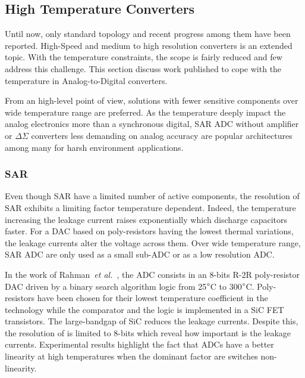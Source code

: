 \clearpage
\subsection{High Temperature Converters}     %
\label{sec:high-temp-adc}
Until now, only standard topology and recent progress among them have been reported. High-Speed and medium to high resolution converters is an extended topic. With the temperature constraints, the scope is fairly reduced and few address this challenge. This section discuss work published to cope with the temperature in Analog-to-Digital converters.

From an high-level point of view, solutions with fewer sensitive components over wide temperature range are preferred. As the temperature deeply impact the analog electronics more than a synchronous digital, SAR ADC without amplifier or \(\Delta\Sigma \) converters less demanding on analog accuracy are popular architectures among many for harsh environment applications.

\subsubsection{SAR}
Even though SAR have a limited number of active components, the resolution of SAR exhibits a limiting factor temperature dependent. Indeed, the temperature increasing the leakage current raises exponentially which discharge capacitors faster. For a DAC based on poly-resistors having the lowest thermal variations, the leakage currents alter the voltage across them. Over wide temperature range, SAR ADC are only used as a small sub-ADC or as a low resolution ADC\@. %

In the work of Rahman~\textit{et al.}~\cite{Rahman2017}, the ADC consists in an 8-bits R-2R poly-resistor DAC driven by a binary search algorithm logic from 25\(\degree \)C to 300\(\degree \)C. Poly-resistors have been chosen for their lowest temperature coefficient in the technology while the comparator and the logic is implemented in a SiC FET transistors. The large-bandgap of SiC reduces the leakage currents. Despite this, the resolution of is limited to 8-bits which reveal how important is the leakage currents. Experimental results highlight the fact that ADCs have a better linearity at high temperatures when the dominant factor are switches non-linearity.


